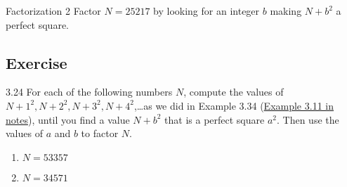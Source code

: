 \begin{example}
    {Factorization 2} Factor \(N = 25217\) by looking for an integer \(b\) making \(N + b^2\) a perfect square.
\end{example}


\renewcommand{\theenumi}{\alph{enumi}}
\renewcommand{\labelenumi}{(\theenumi)}
\subsection{Exercise}

\begin{exercise}
    {3.24} {For each of the following numbers \(N\), compute the values of \(N + 1^2, N + 2^2, N + 3^2, N + 4^2\),\dots as we did in Example 3.34 (\hyperref[ex:3.11]{Example 3.11 in notes}), until you find a value \(N + b^2\) that is a perfect square \(a^2\). Then use the values of \(a\) and \(b\) to factor \(N\).}
    \begin{enumerate}
        \item \(N = 53357\)
        \item \(N = 34571\)
    \end{enumerate}
\end{exercise}

